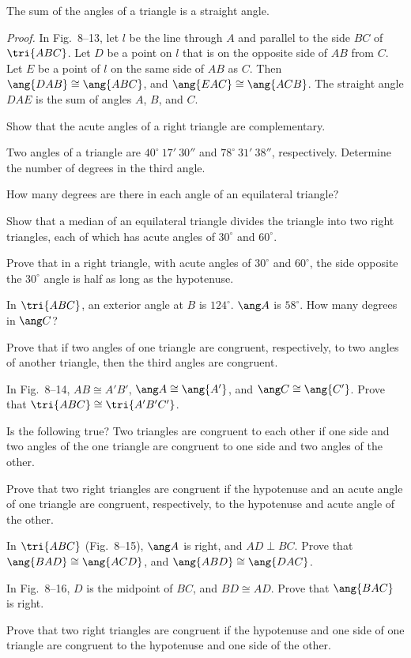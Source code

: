 \documentclass[11pt]{book}
\theoremstyle{bkplain}
\theoremstyle{XIplainnote}
\theoremstyle{bkplain}
\theoremstyle{bkplain}
\begin{document}
\begin{theorem}
The sum of the angles of a triangle is a straight angle.
\end{theorem}

\FIGVIIITHIRTEEN

\emph{Proof.} In Fig.~8--13, let $l$ be the line through $A$ and parallel to
the side $BC$ of $\tri{ABC}$. Let $D$ be a point on $l$ that is on the
opposite side of $AB$ from $C$. Let $E$ be a point of $l$ on the same side of
$AB$ as $C$. Then $\ang{DAB} \cong \ang{ABC}$, and
$\ang{EAC} \cong \ang{ACB}$. The straight angle $DAE$ is the sum of angles
$A$, $B$, and $C$.

\begin{exercisecols}
\begin{exlist}
\item Show that the acute angles of a right triangle are complementary.
\item Two angles of a triangle are $40^\circ\ 17'\ 30''$ and
  $78^\circ\ 31'\ 38''$, respectively. Determine the number of degrees in the
  third angle.
\item How many degrees are there in each angle of an equilateral triangle?
\item Show that a median of an equilateral triangle divides the triangle into
  two right triangles, each of which has acute angles of $30^\circ$ and
  $60^\circ$.
\item Prove that in a right triangle, with acute angles of $30^\circ$ and
  $60^\circ$, the side opposite the $30^\circ$ angle is half as long as the
  hypotenuse.
\item In $\tri{ABC}$, an exterior angle at $B$ is $124^\circ$. $\ang A$ is
  $58^\circ$. How many degrees in $\ang C$?
\item Prove that if two angles of one triangle are congruent, respectively, to
  two angles of another triangle, then the third angles are congruent.
\item In Fig.~8--14, $AB \cong A'B'$, $\ang A \cong \ang{A'}$, and
  $\ang C \cong \ang{C'}$. Prove that $\tri{ABC} \cong \tri{A'B'C'}$.
\exfig{\FIGVIIIFOURTEEN}
\item Is the following true? Two triangles are congruent to each other if one
  side and two angles of the one triangle are congruent to one side and two
  angles of the other.
\item Prove that two right triangles are congruent if the hypotenuse and an
  acute angle of one triangle are congruent, respectively, to the hypotenuse
  and acute angle of the other.
\item In $\tri{ABC}$ (Fig.~8--15), $\ang A$ is right, and $AD \perp BC$. Prove
  that $\ang{BAD} \cong \ang{ACD}$, and $\ang{ABD} \cong \ang{DAC}$.
\exfig{\FIGVIIIFIFTEEN}
\item[\stex 12.] In Fig.~8--16, $D$ is the midpoint of $BC$, and
  $BD \cong AD$. Prove that $\ang{BAC}$ is right.
\exfig{\FIGVIIISIXTEEN}
\item[\stex 13.] Prove that two right triangles are congruent if the
  hypotenuse and one side of one triangle are congruent to the hypotenuse and
  one side of the other.
\end{exlist}
\end{exercisecols}
\end{document}
